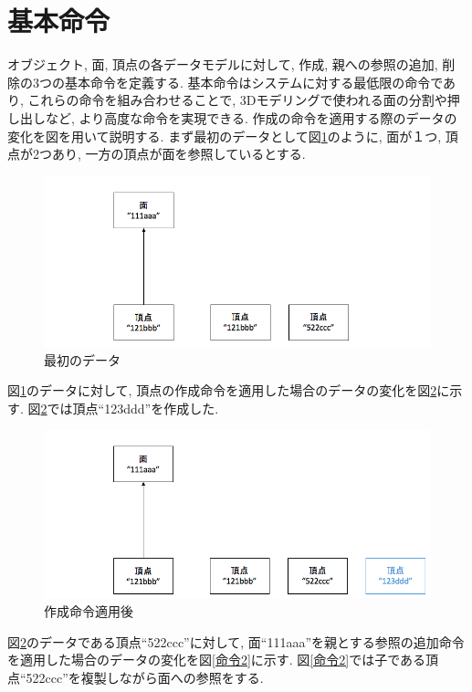 \section{基本命令} \label{ope}
オブジェクト, 面, 頂点の各データモデルに対して, 作成, 親への参照の追加, 削除の3つの基本命令を定義する.
基本命令はシステムに対する最低限の命令であり, これらの命令を組み合わせることで, 3Dモデリングで使われる面の分割や押し出しなど, より高度な命令を実現できる.
作成の命令を適用する際のデータの変化を図を用いて説明する.
まず最初のデータとして図\ref{命令0}のように, 面が１つ, 頂点が2つあり, 一方の頂点が面を参照しているとする.
\begin{figure}[htbp]
  \begin{center}
    \includegraphics[scale=0.45]{images/ope0}
    \caption{最初のデータ}
    \label{命令0}
  \end{center}
\end{figure}
図\ref{命令0}のデータに対して, 頂点の作成命令を適用した場合のデータの変化を図\ref{命令1}に示す. 図\ref{命令1}では頂点``123ddd''を作成した.
\begin{figure}[htbp]
  \begin{center}
    \includegraphics[scale=0.45]{images/ope1}
    \caption{作成命令適用後}
    \label{命令1}
  \end{center}
\end{figure}
図\ref{命令1}のデータである頂点``522ccc''に対して, 面``111aaa''を親とする参照の追加命令を適用した場合のデータの変化を図\ref{命令2}に示す. 図\ref{命令2}では子である頂点``522ccc''を複製しながら面への参照をする.
